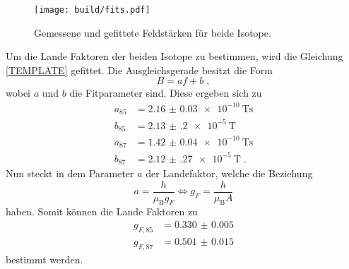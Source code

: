 \begin{figure}
    \centering
    \caption{Gemessene und gefittete Feldstärken für beide Isotope.}
    \label{fig:fit}
    \texttt{[image: build/fits.pdf]}
\end{figure}
Um die Lande Faktoren der beiden Isotope zu bestimmen, wird die Gleichung \eqref{TEMPLATE} gefittet.
Die Ausgleichsgerade besitzt die Form
\begin{equation*}
    B =  af + b \; ,
\end{equation*} 
wobei $a$ und $b$ die Fitparameter sind.
Diese ergeben sich zu 
\begin{align*}
    a_{85} &= \qty{2.16(3)e-10}{\tesla\second}   \\
    b_{85} &= \qty{2.13(20)e-5}{\tesla}            \\
    a_{87} &= \qty{1.42(4)e-10}{\tesla\second}   \\
    b_{87} &= \qty{2.12(27)e-5}{\tesla}            \; .
\end{align*}
Nun steckt in dem Parameter $a$ der Landefaktor, welche die Beziehung 
\begin{equation*}
    a = \frac{h}{\mu_\text{B}g_F} \iff g_F = \frac{h}{\mu_\text{B}A}
\end{equation*}
haben.
Somit können die Lande Faktoren zu 
\begin{align*}
    g_{F, 85} &= \num{0.330(5)} \\
    g_{F, 87} &= \num{0.501(15)}
\end{align*}
bestimmt werden.